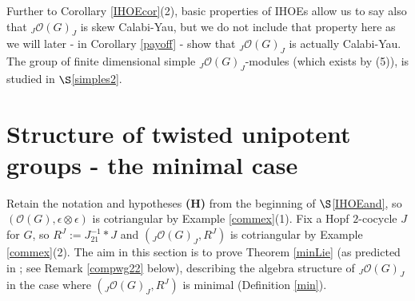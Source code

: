 \documentclass{amsart}
\numberwithin{equation}{section}
\theoremstyle{definition}
\begin{document}
Further to Corollary \ref{IHOEcor}(2), basic properties of IHOEs allow us to say also that $_J\mathcal{O}(G)_J$ is skew Calabi-Yau, but we do not include that property here as we will later - in Corollary \ref{payoff} - show that $_J\mathcal{O}(G)_J$ is actually Calabi-Yau. The group of finite dimensional simple ${}_J\mathcal{O}(G)_J$-modules (which exists by (5)), is studied in $\S$\ref{simples2}.

\section{Structure of twisted unipotent groups - the minimal case}\label{structure}

Retain the notation and hypotheses {\bf (H)} from the beginning of $\S$\ref{IHOEand}, so $(\mathcal{O}(G),\epsilon \otimes \epsilon)$ is cotriangular by Example \ref{commex}(1). Fix a Hopf $2$-cocycle $J$ for $G$, so $R^J:= J_{21}^{-1}\ast J$ and $({}_J\mathcal{O}(G)_J, R^J)$ is cotriangular by Example \ref{commex}(2). The aim in this section is to prove Theorem \ref{minLie} (as predicted in \cite[Theorem 3.4]{G2}; see Remark \ref{compwg22} below), describing the algebra structure of ${}_J\mathcal{O}(G)_J$ in the case where $({}_J\mathcal{O}(G)_J, R^J)$ is minimal (Definition \ref{min}). 
\end{document}
